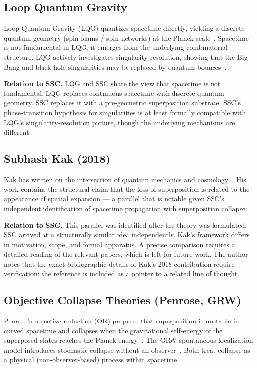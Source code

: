 \documentclass[12pt,a4paper]{article}
\begin{document}
\subsection{Loop Quantum Gravity}

Loop Quantum Gravity (LQG) quantizes spacetime directly, yielding a
discrete quantum geometry (spin foams / spin networks) at the Planck
scale~\citep{rovelli1988}.  Spacetime is not fundamental in LQG; it
emerges from the underlying combinatorial structure.  LQG
actively investigates singularity resolution, showing that the Big
Bang and black hole singularities may be replaced by quantum
bounces~\citep{ashtekar2006}.

\textbf{Relation to SSC.}  LQG and SSC share the view that spacetime
is not fundamental.  LQG replaces continuous spacetime with discrete
quantum geometry.  SSC replaces it with a pre-geometric superposition
substrate.  SSC's phase-transition hypothesis for singularities is at
least formally compatible with LQG's singularity-resolution picture,
though the underlying mechanisms are different.

\subsection{Subhash Kak (2018)}

Kak has written on the intersection of quantum mechanics and
cosmology~\citep{kak2018}.  His work contains the structural claim
that the loss of superposition is related to the appearance of spatial
expansion — a parallel that is notable given SSC's independent
identification of spacetime propagation with superposition collapse.

\textbf{Relation to SSC.}  This parallel was identified after the
theory was formulated.  SSC arrived at a structurally similar idea
independently.  Kak's framework differs in motivation, scope, and
formal apparatus.  A precise comparison requires a detailed reading of
the relevant papers, which is left for future work.  The author notes
that the exact bibliographic details of Kak's 2018 contribution require
verification; the reference is included as a pointer to a related line
of thought.

\subsection{Objective Collapse Theories (Penrose, GRW)}

Penrose's objective reduction (OR) proposes that superposition is
unstable in curved spacetime and collapses when the gravitational
self-energy of the superposed states reaches the Planck
energy~\citep{penrose1996}.  The GRW spontaneous-localization
model introduces stochastic collapse without an
observer~\citep{ghirardi1986}.  Both treat collapse as a physical
(non-observer-based) process within spacetime.
\end{document}
